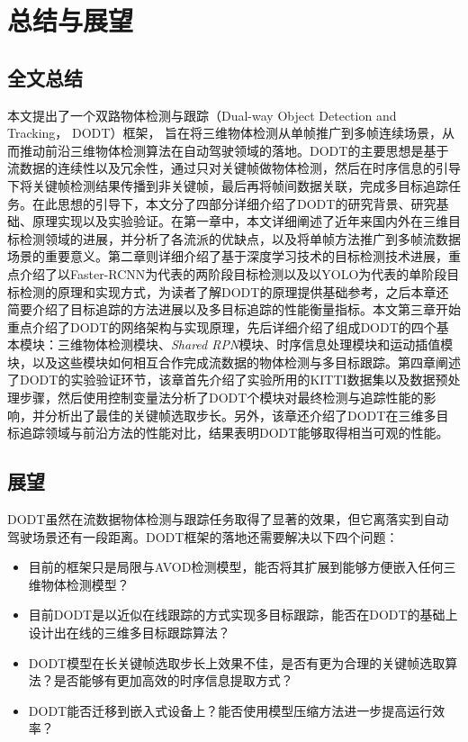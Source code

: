 \chapter{总结与展望}
\label{conclusion}

\section{全文总结}
\label{summary}
本文提出了一个双路物体检测与跟踪（Dual-way Object Detection and Tracking， DODT）框架， 旨在将三维物体检测从单帧推广到多帧连续场景，从而推动前沿三维物体检测算法在自动驾驶领域的落地。DODT的主要思想是基于流数据的连续性以及冗余性，通过只对关键帧做物体检测，然后在时序信息的引导下将关键帧检测结果传播到非关键帧，最后再将帧间数据关联，完成多目标追踪任务。在此思想的引导下，本文分了四部分详细介绍了DODT的研究背景、研究基础、原理实现以及实验验证。在第一章中，本文详细阐述了近年来国内外在三维目标检测领域的进展，并分析了各流派的优缺点，以及将单帧方法推广到多帧流数据场景的重要意义。第二章则详细介绍了基于深度学习技术的目标检测技术进展，重点介绍了以Faster-RCNN为代表的两阶段目标检测以及以YOLO为代表的单阶段目标检测的原理和实现方式，为读者了解DODT的原理提供基础参考，之后本章还简要介绍了目标追踪的方法进展以及多目标追踪的性能衡量指标。本文第三章开始重点介绍了DODT的网络架构与实现原理，先后详细介绍了组成DODT的四个基本模块：三维物体检测模块、\textit{Shared RPN}模块、时序信息处理模块和运动插值模块，以及这些模块如何相互合作完成流数据的物体检测与多目标跟踪。第四章阐述了DODT的实验验证环节，该章首先介绍了实验所用的KITTI数据集以及数据预处理步骤，然后使用控制变量法分析了DODT个模块对最终检测与追踪性能的影响，并分析出了最佳的关键帧选取步长。另外，该章还介绍了DODT在三维多目标追踪领域与前沿方法的性能对比，结果表明DODT能够取得相当可观的性能。


\section{展望}
\label{future}
DODT虽然在流数据物体检测与跟踪任务取得了显著的效果，但它离落实到自动驾驶场景还有一段距离。DODT框架的落地还需要解决以下四个问题：

\begin{itemize}
\item 目前的框架只是局限与AVOD检测模型，能否将其扩展到能够方便嵌入任何三维物体检测模型？
\item 目前DODT是以近似在线跟踪的方式实现多目标跟踪，能否在DODT的基础上设计出在线的三维多目标跟踪算法？
\item DODT模型在长关键帧选取步长上效果不佳，是否有更为合理的关键帧选取算法？是否能够有更加高效的时序信息提取方式？
\item DODT能否迁移到嵌入式设备上？能否使用模型压缩方法进一步提高运行效率？
\end{itemize}

